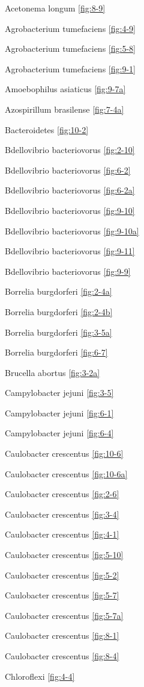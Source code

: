 \documentclass[]{tufte-book}
\begin{document}
Acetonema longum \ref{fig:8-9}

Agrobacterium tumefaciens \ref{fig:4-9}

Agrobacterium tumefaciens \ref{fig:5-8}

Agrobacterium tumefaciens \ref{fig:9-1}

Amoebophilus asiaticus \ref{fig:9-7a}

Azospirillum brasilense \ref{fig:7-4a}

Bacteroidetes \ref{fig:10-2}

Bdellovibrio bacteriovorus \ref{fig:2-10}

Bdellovibrio bacteriovorus \ref{fig:6-2}

Bdellovibrio bacteriovorus \ref{fig:6-2a}

Bdellovibrio bacteriovorus \ref{fig:9-10}

Bdellovibrio bacteriovorus \ref{fig:9-10a}

Bdellovibrio bacteriovorus \ref{fig:9-11}

Bdellovibrio bacteriovorus \ref{fig:9-9}

Borrelia burgdorferi \ref{fig:2-4a}

Borrelia burgdorferi \ref{fig:2-4b}

Borrelia burgdorferi \ref{fig:3-5a}

Borrelia burgdorferi \ref{fig:6-7}

Brucella abortus \ref{fig:3-2a}

Campylobacter jejuni \ref{fig:3-5}

Campylobacter jejuni \ref{fig:6-1}

Campylobacter jejuni \ref{fig:6-4}

Caulobacter crescentus \ref{fig:10-6}

Caulobacter crescentus \ref{fig:10-6a}

Caulobacter crescentus \ref{fig:2-6}

Caulobacter crescentus \ref{fig:3-4}

Caulobacter crescentus \ref{fig:4-1}

Caulobacter crescentus \ref{fig:5-10}

Caulobacter crescentus \ref{fig:5-2}

Caulobacter crescentus \ref{fig:5-7}

Caulobacter crescentus \ref{fig:5-7a}

Caulobacter crescentus \ref{fig:8-1}

Caulobacter crescentus \ref{fig:8-4}

Chloroflexi \ref{fig:4-4}
\end{document}
